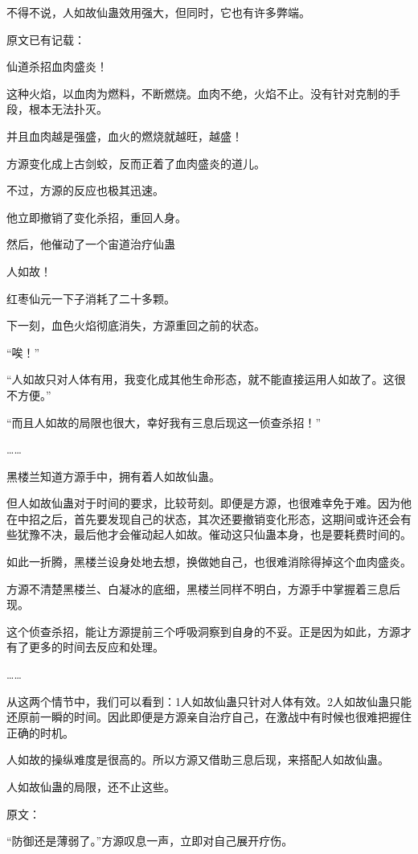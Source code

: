 \begin{this_body}
不得不说，人如故仙蛊效用强大，但同时，它也有许多弊端。

原文已有记载：

仙道杀招血肉盛炎！

这种火焰，以血肉为燃料，不断燃烧。血肉不绝，火焰不止。没有针对克制的手段，根本无法扑灭。

并且血肉越是强盛，血火的燃烧就越旺，越盛！

方源变化成上古剑蛟，反而正着了血肉盛炎的道儿。

不过，方源的反应也极其迅速。

他立即撤销了变化杀招，重回人身。

然后，他催动了一个宙道治疗仙蛊

人如故！

红枣仙元一下子消耗了二十多颗。

下一刻，血色火焰彻底消失，方源重回之前的状态。

“唉！”

“人如故只对人体有用，我变化成其他生命形态，就不能直接运用人如故了。这很不方便。”

“而且人如故的局限也很大，幸好我有三息后现这一侦查杀招！”

……

黑楼兰知道方源手中，拥有着人如故仙蛊。

但人如故仙蛊对于时间的要求，比较苛刻。即便是方源，也很难幸免于难。因为他在中招之后，首先要发现自己的状态，其次还要撤销变化形态，这期间或许还会有些犹豫不决，最后他才会催动起人如故。催动这只仙蛊本身，也是要耗费时间的。

如此一折腾，黑楼兰设身处地去想，换做她自己，也很难消除得掉这个血肉盛炎。

方源不清楚黑楼兰、白凝冰的底细，黑楼兰同样不明白，方源手中掌握着三息后现。

这个侦查杀招，能让方源提前三个呼吸洞察到自身的不妥。正是因为如此，方源才有了更多的时间去反应和处理。

……

从这两个情节中，我们可以看到：1人如故仙蛊只针对人体有效。2人如故仙蛊只能还原前一瞬的时间。因此即便是方源亲自治疗自己，在激战中有时候也很难把握住正确的时机。

人如故的操纵难度是很高的。所以方源又借助三息后现，来搭配人如故仙蛊。

人如故仙蛊的局限，还不止这些。

原文：

“防御还是薄弱了。”方源叹息一声，立即对自己展开疗伤。


\end{this_body}
